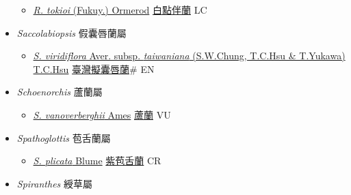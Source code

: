 \begin{itemize}
  \begin{itemize}
        \item[] \href{http://www.theplantlist.org/tpl1.1/search?q=Rhomboda+tokioi}{\textit{R. tokioi} (Fukuy.) Ormerod}   \href{\detokenize{http://taibnet.sinica.edu.tw/chi/taibnet_species_list.php?T2=白點伴蘭&T2_new_value=true&fr=y}}{白點伴蘭} LC
  \end{itemize}
 \item[] \textit{Saccolabiopsis} 假囊唇蘭屬
                    
  \begin{itemize}
        \item[] \href{http://www.theplantlist.org/tpl1.1/search?q=Saccolabiopsis+viridiflora+subsp.+taiwaniana}{\textit{S. viridiflora} Aver. subsp. \textit{taiwaniana} (S.W.Chung, T.C.Hsu \& T.Yukawa) T.C.Hsu}   \href{\detokenize{http://taibnet.sinica.edu.tw/chi/taibnet_species_list.php?T2=臺灣擬囊唇蘭&T2_new_value=true&fr=y}}{臺灣擬囊唇蘭}\# EN
  \end{itemize}
 \item[] \textit{Schoenorchis} 蘆蘭屬
                    
  \begin{itemize}
        \item[] \href{http://www.theplantlist.org/tpl1.1/search?q=Schoenorchis+vanoverberghii}{\textit{S. vanoverberghii} Ames}   \href{\detokenize{http://taibnet.sinica.edu.tw/chi/taibnet_species_list.php?T2=蘆蘭&T2_new_value=true&fr=y}}{蘆蘭} VU
  \end{itemize}
 \item[] \textit{Spathoglottis} 苞舌蘭屬
                    
  \begin{itemize}
        \item[] \href{http://www.theplantlist.org/tpl1.1/search?q=Spathoglottis+plicata}{\textit{S. plicata} Blume}   \href{\detokenize{http://taibnet.sinica.edu.tw/chi/taibnet_species_list.php?T2=紫苞舌蘭&T2_new_value=true&fr=y}}{紫苞舌蘭} CR
  \end{itemize}
 \item[] \textit{Spiranthes} 綬草屬
                    

\end{itemize}
